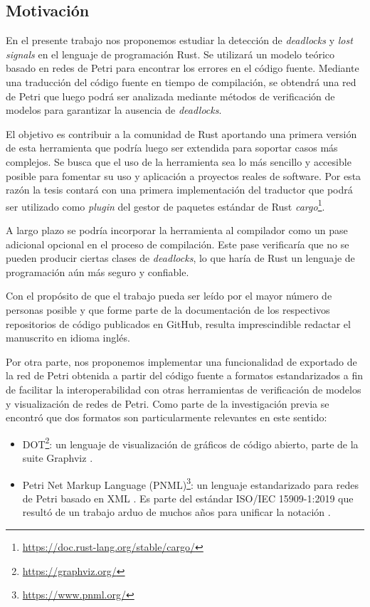 \documentclass[12pt]{article}
\begin{document}
\subsection{Motivación}
\label{motivation}

En el presente trabajo nos proponemos estudiar la detección de \textit{deadlocks} y \textit{lost signals} en el lenguaje de programación Rust.
Se utilizará un modelo teórico basado en redes de Petri para encontrar los errores en el código fuente.
Mediante una traducción del código fuente en tiempo de compilación,
se obtendrá una red de Petri que luego podrá ser analizada mediante métodos de verificación de modelos para garantizar la ausencia de \textit{deadlocks}.

El objetivo es contribuir a la comunidad de Rust aportando una primera versión de esta herramienta que podría luego ser extendida para soportar casos más complejos.
Se busca que el uso de la herramienta sea lo más sencillo y accesible posible para fomentar su uso y aplicación a proyectos reales de software.
Por esta razón la tesis contará con una primera implementación del traductor que podrá ser utilizado como \textit{plugin}
del gestor de paquetes estándar de Rust \textit{cargo}\footnote{\url{https://doc.rust-lang.org/stable/cargo/}}.

A largo plazo se podría incorporar la herramienta al compilador como un pase adicional opcional en el proceso de compilación.
Este pase verificaría que no se pueden producir ciertas clases de \textit{deadlocks}, lo que haría de Rust un lenguaje de programación aún más seguro y confiable.

Con el propósito de que el trabajo pueda ser leído por el mayor número de personas posible y
que forme parte de la documentación de los respectivos repositorios de código publicados en GitHub,
resulta imprescindible redactar el manuscrito en idioma inglés.

Por otra parte, nos proponemos implementar una funcionalidad de exportado de la red de Petri obtenida a partir del código fuente
a formatos estandarizados a fin de facilitar la interoperabilidad con otras herramientas de verificación de modelos y visualización de redes de Petri.
Como parte de la investigación previa se encontró que dos formatos son particularmente relevantes en este sentido:

\begin{itemize}
    \item DOT\footnote{\url{https://graphviz.org/}}: un lenguaje de visualización de gráficos de código abierto, parte de la suite Graphviz \cite{dot2015}.
    \item Petri Net Markup Language (PNML)\footnote{\url{https://www.pnml.org/}}: un lenguaje estandarizado para redes de Petri basado en XML \cite{pnml2000}.
          Es parte del estándar ISO/IEC 15909-1:2019 que resultó de un trabajo arduo de muchos años para unificar la notación \cite{hillah:hal-01176335}.
\end{itemize}
\end{document}
